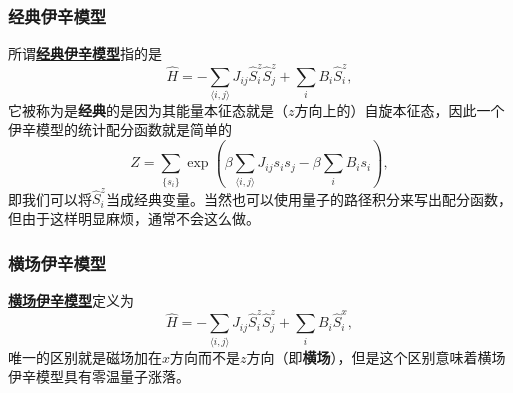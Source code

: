 \documentclass[hyperref, UTF8, a4paper]{ctexart}
\newcommand*{\pair}[1]{\langle #1 \rangle}
\renewcommand{\emph}[1]{\textbf{#1}}
\newcommand*{\concept}[1]{\underline{\textbf{#1}}}
\begin{document}
\subsubsection{经典伊辛模型}

所谓\concept{经典伊辛模型}指的是
\begin{equation}
    \hat{H} = - \sum_{\pair{i, j}} J_{ij} \hat{S}_i^z \hat{S}_j^z + \sum_{i} B_i \hat{S}_i^z,
\end{equation}
它被称为是\emph{经典}的是因为其能量本征态就是（$z$方向上的）自旋本征态，因此一个伊辛模型的统计配分函数就是简单的
\begin{equation}
    Z = \sum_{\{s_i\}} \exp(\beta \sum_{\pair{i, j}} J_{ij} s_i s_j - \beta \sum_i B_i s_i),
\end{equation}
即我们可以将$\hat{S}_i^z$当成经典变量。当然也可以使用量子的路径积分来写出配分函数，但由于这样明显麻烦，通常不会这么做。

\subsubsection{横场伊辛模型}

\concept{横场伊辛模型}定义为
\begin{equation}
    \hat{H} = - \sum_{\pair{i, j}} J_{ij} \hat{S}_i^z \hat{S}_j^z + \sum_{i} B_i \hat{S}_i^x,
\end{equation}
唯一的区别就是磁场加在$x$方向而不是$z$方向（即\emph{横场}），但是这个区别意味着横场伊辛模型具有零温量子涨落。
\end{document}

